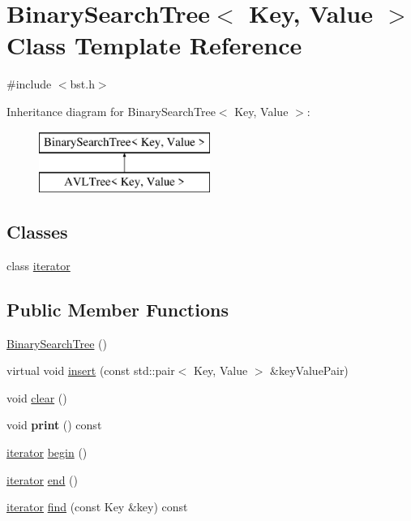 \hypertarget{classBinarySearchTree}{\section{Binary\-Search\-Tree$<$ Key, Value $>$ Class Template Reference}
\label{classBinarySearchTree}
}


{\ttfamily \#include $<$bst.\-h$>$}

Inheritance diagram for Binary\-Search\-Tree$<$ Key, Value $>$\-:\begin{figure}[H]
\begin{center}
\leavevmode
\includegraphics[height=2.000000cm]{classBinarySearchTree}
\end{center}
\end{figure}
\subsection*{Classes}
\begin{DoxyCompactItemize}
\item 
class \hyperlink{classBinarySearchTree_1_1iterator}{iterator}
\end{DoxyCompactItemize}
\subsection*{Public Member Functions}
\begin{DoxyCompactItemize}
\item 
\hyperlink{classBinarySearchTree_ad755ed0485364094f462ce45cf6ecf62}{Binary\-Search\-Tree} ()
\item 
virtual void \hyperlink{classBinarySearchTree_af78f03f88b44453dc2e35278c49b2965}{insert} (const std\-::pair$<$ Key, Value $>$ \&key\-Value\-Pair)
\item 
void \hyperlink{classBinarySearchTree_acce1030d8eb99522591b90e0824e7bbc}{clear} ()
\item 
\hypertarget{classBinarySearchTree_af2f724b66e0da79f2d65144824224c97}{void {\bfseries print} () const }\label{classBinarySearchTree_af2f724b66e0da79f2d65144824224c97}

\item 
\hyperlink{classBinarySearchTree_1_1iterator}{iterator} \hyperlink{classBinarySearchTree_ac42b6e11e290cf9eaf56eba56ca56818}{begin} ()
\item 
\hyperlink{classBinarySearchTree_1_1iterator}{iterator} \hyperlink{classBinarySearchTree_a6603b43057a4bf2843381b8abcb0d010}{end} ()
\item 
\hyperlink{classBinarySearchTree_1_1iterator}{iterator} \hyperlink{classBinarySearchTree_a43958308bfdd55c71cb926d32816f3c1}{find} (const Key \&key) const 
\end{DoxyCompactItemize}
